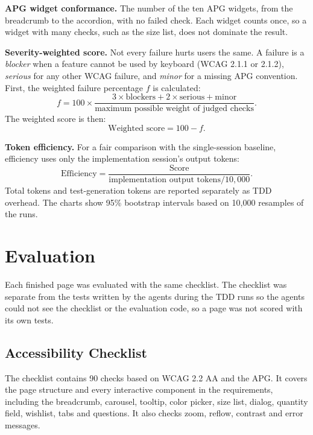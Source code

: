 \documentclass[conference]{IEEEtran}
\begin{document}
\textbf{APG widget conformance.} The number of the ten APG widgets, from the breadcrumb to the accordion, with no failed check. Each widget counts once, so a widget with many checks, such as the size list, does not dominate the result.

\textbf{Severity-weighted score.} Not every failure hurts users the same. A failure is a \emph{blocker} when a feature cannot be used by keyboard (WCAG 2.1.1 or 2.1.2), \emph{serious} for any other WCAG failure, and \emph{minor} for a missing APG convention. First, the weighted failure percentage $f$ is calculated:
\begin{equation}
  f = 100 \times \frac{3 \times \text{blockers} + 2 \times \text{serious} + \text{minor}}{\text{maximum possible weight of judged checks}}.
\end{equation}
The weighted score is then:
\begin{equation}
  \text{Weighted score} = 100 - f.
\end{equation}

\textbf{Token efficiency.} For a fair comparison with the single-session baseline, efficiency uses only the implementation session's output tokens:
\begin{equation}
  \text{Efficiency} = \frac{\text{Score}}{\text{implementation output tokens} / 10{,}000}.
\end{equation}
Total tokens and test-generation tokens are reported separately as TDD overhead.
The charts show 95\% bootstrap intervals based on 10{,}000 resamples of the runs.

\section{Evaluation}
\label{sec:evaluation}


Each finished page was evaluated with the same checklist. The checklist was separate from the tests written by the agents during the TDD runs so the agents could not see the checklist or the evaluation code, so a page was not scored with its own tests.

\subsection{Accessibility Checklist}

The checklist contains 90 checks based on WCAG 2.2 AA and the APG. It covers the page structure and every interactive component in the requirements, including the breadcrumb, carousel, tooltip, color picker, size list, dialog, quantity field, wishlist, tabs and questions. It also checks zoom, reflow, contrast and error messages.
\end{document}
